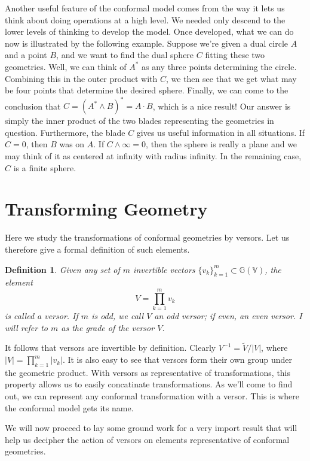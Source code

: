 \documentclass[12pt]{article}
\newcommand{\G}{\mathbb{G}}
\newcommand{\V}{\mathbb{V}}
\newcommand{\nvai}{\infty}
\newtheorem{definition}{Definition}[section]
\begin{document}
Another useful feature of the conformal model comes from the way it lets
us think about doing operations at a high level.  We needed only descend to
the lower levels of thinking to develop the model.  Once developed, what we can do now is illustrated
by the following example.  Suppose we're given a dual circle $A$ and
a point $B$, and we want to find the dual sphere $C$ fitting these two geometries.
Well, we can think of $A^*$ as any three points determining the circle.
Combining this in the outer product with $C$, we then see that we
get what may be four points that determine the desired sphere.
Finally, we can come to the conclusion that $C=(A^*\wedge B)^*=A\cdot B$,
which is a nice result!  Our answer is simply the inner product of the two blades
representing the geometries in question.  Furthermore, the blade $C$ gives
us useful information in all situations.  If $C=0$, then $B$ was on $A$.
If $C\wedge\nvai=0$, then the sphere is really a plane and we may
think of it as centered at infinity with radius infinity.  In the remaining case, $C$ is
a finite sphere.

\section{Transforming Geometry}

Here we study the transformations of conformal geometries
by versors.  Let us therefore give a formal definition of such
elements.
\begin{definition}
Given any set of $m$ invertible vectors $\{v_k\}_{k=1}^m\subset\G(\V)$,
the element
\begin{equation*}
V = \prod_{k=1}^m v_k
\end{equation*}
is called a versor.
If $m$ is odd, we call $V$ an odd versor; if even, an even versor.
I will refer to $m$ as the grade of the versor $V$.
\end{definition}
It follows that versors are invertible by definition.  Clearly $V^{-1}=\tilde{V}/|V|$,
where $|V|=\prod_{k=1}^m |v_k|$.  It is also easy to see that versors
form their own group under the geometric product.  With versors as representative
of transformations, this property allows us to easily concatinate transformations.
As we'll come to find out, we can represent any conformal transformation with
a versor.  This is where the conformal model gets its name.

We will now proceed to lay some ground work
for a very import result that will help us decipher the action of versors on elements
representative of conformal geometries.
\end{document}
